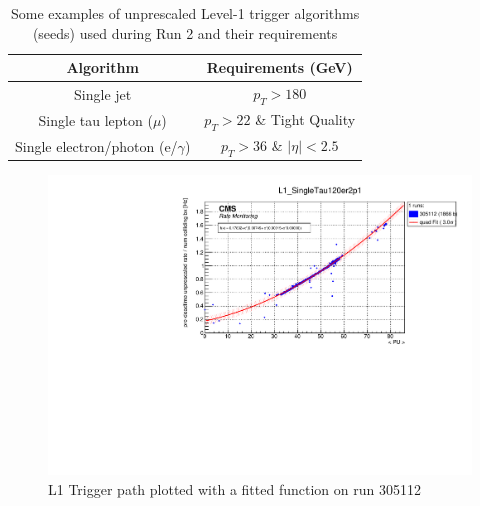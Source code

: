 \begin{table}
\begin{center}
 \begin{tabular}{||c c||} 
 \hline
 Algorithm & Requirements (GeV)\\ [0.5ex] 
 \hline\hline
 Single jet & $p_T > 180$ \\ 
 \hline
 Single tau lepton ($\mu$)      & $p_T > 22$ \& Tight Quality \\ 
  \hline
 Single electron/photon (e/$\gamma$) & $p_T > 36$ \& $|\eta| < 2.5$ \\ [1ex] 
 \hline
\end{tabular}
\caption{Some examples of unprescaled Level-1 trigger algorithms (seeds) used during Run 2 and their requirements \cite{Sirunyan:2721198}}
\end{center}
\end{table}


\begin{figure}
    \centerline{
        \includegraphics[width=0.6\paperwidth]{figures/RMT_305112_L1_SingleTau120er2p1.pdf}}
    \caption{L1 Trigger path plotted with a fitted function on run 305112}
    \label{fig:ratemon_l1}
\end{figure}

